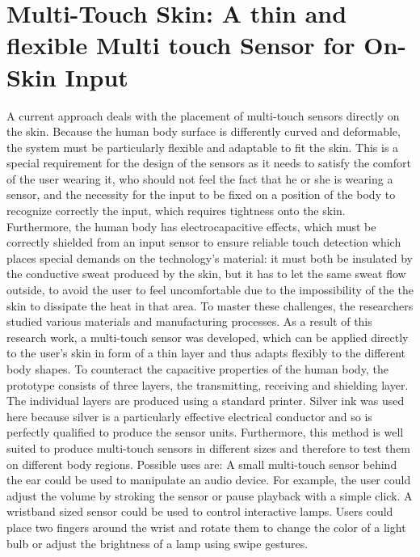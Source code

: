 \documentclass{sigchi}
\begin{document}
\section{Multi-Touch Skin: A thin and flexible Multi touch Sensor for On-Skin Input}
A current approach deals with the placement of multi-touch sensors directly on the skin. Because the human body surface is differently curved and deformable, the system must be particularly flexible and adaptable to fit the skin. This is a special requirement for the design of the sensors as it needs to satisfy the comfort of the user wearing it, who should not feel the fact that he or she is wearing a sensor, and the necessity for the input to be fixed on a position of the body to recognize correctly the input, which requires tightness onto the skin. Furthermore, the human body has electrocapacitive effects, which must be correctly shielded from an input sensor to ensure reliable touch detection which places special demands on the technology's material: it must both be insulated by the conductive sweat produced by the skin, but it has to let the same sweat flow outside, to avoid the user to feel uncomfortable due to the impossibility of the the skin to dissipate the heat in that area.
To master these challenges, the researchers studied various materials and manufacturing processes. As a result of this research work, a multi-touch sensor was developed, which can be applied directly to the user's skin in form of a thin layer and thus adapts flexibly to the different body shapes. To counteract the capacitive properties of the human body, the prototype consists of three layers, the transmitting, receiving and shielding layer. The individual layers are produced using a standard printer. Silver ink was used here because silver is a particularly effective electrical conductor and so is perfectly qualified to produce the sensor units. Furthermore, this method is well suited to produce multi-touch sensors in different sizes and therefore to test them on different body regions.
Possible uses are:
A small multi-touch sensor behind the ear could be used to manipulate an audio device. For example, the user could adjust the volume by stroking the sensor or pause playback with a simple click. A wristband sized sensor could be used to control interactive lamps. Users could place two fingers around the wrist and rotate them to change the color of a light bulb or adjust the brightness of a lamp using swipe gestures.
\end{document}
